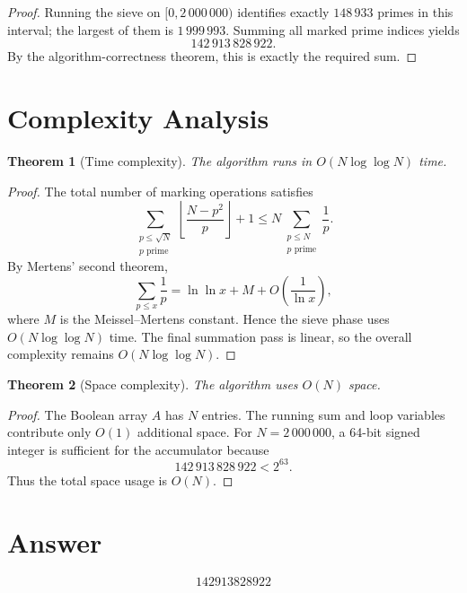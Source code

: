 \documentclass[11pt]{article}
\newtheorem{theorem}{Theorem}
\begin{document}
\begin{proof}
Running the sieve on $[0,2\,000\,000)$ identifies exactly $148\,933$ primes in this interval; the largest of them is $1\,999\,993$. Summing all marked prime indices yields
\[
142\,913\,828\,922.
\]
By the algorithm-correctness theorem, this is exactly the required sum.
\end{proof}

\section{Complexity Analysis}

\begin{theorem}[Time complexity]
The algorithm runs in $O(N \log\log N)$ time.
\end{theorem}

\begin{proof}
The total number of marking operations satisfies
\[
\sum_{\substack{p \le \sqrt{N} \\ p \text{ prime}}} \left\lfloor \frac{N-p^2}{p} \right\rfloor + 1
\le N \sum_{\substack{p \le N \\ p \text{ prime}}} \frac{1}{p}.
\]
By Mertens' second theorem,
\[
\sum_{p \le x} \frac{1}{p} = \ln\ln x + M + O\!\left(\frac{1}{\ln x}\right),
\]
where $M$ is the Meissel--Mertens constant. Hence the sieve phase uses $O(N \log\log N)$ time. The final summation pass is linear, so the overall complexity remains $O(N \log\log N)$.
\end{proof}

\begin{theorem}[Space complexity]
The algorithm uses $O(N)$ space.
\end{theorem}

\begin{proof}
The Boolean array $A$ has $N$ entries. The running sum and loop variables contribute only $O(1)$ additional space. For $N = 2\,000\,000$, a 64-bit signed integer is sufficient for the accumulator because
\[
142\,913\,828\,922 < 2^{63}.
\]
Thus the total space usage is $O(N)$.
\end{proof}

\section{Answer}

\[
\boxed{142913828922}
\]
\end{document}

